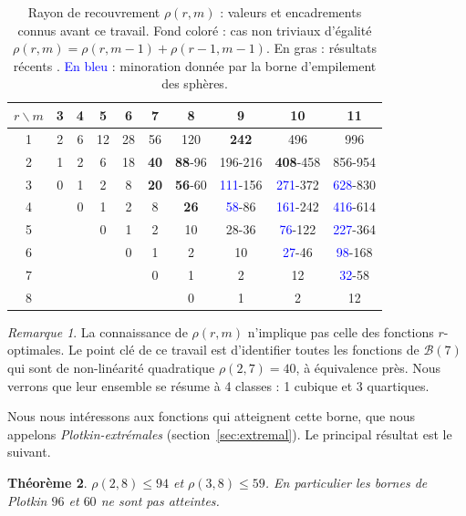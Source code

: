 \documentclass[11pt,a4paper]{article}
\def\boole(#1){\mathcal{B}(#1)}
\def\SPB#1{\textcolor{blue}{#1}}
\theoremstyle{plain}
\newtheorem{theorem}{Théorème}[section]
\theoremstyle{definition}
\theoremstyle{remark}
\newtheorem{remark}[theorem]{Remarque}
\begin{document}
\begin{table}[ht]
\centering
\caption{Rayon de recouvrement $\rho(r,m)$ : valeurs et encadrements connus avant
ce travail. Fond coloré : cas non triviaux d'égalité
$\rho(r,m)=\rho(r,m-1)+\rho(r-1,m-1)$. En gras : résultats récents
\cite{Wang19,GKLW,GL23,RM19,HSS26,KGP26}. \SPB{En bleu} : minoration donnée par la
borne d'empilement des sphères.}
\label{tab:tab_rho}
\begin{tabular}{c|ccccccccc}
$r\backslash m$ & 3 & 4 & 5 & 6 & 7 & 8 & 9 & 10 & 11 \\
\hline
1 & 2 & \cellcolor{plotkin}6 & 12 & \cellcolor{plotkin}28 & 56 & \cellcolor{plotkin}120 & \textbf{242} & 496 & 996 \\
2 & 1 & 2 & 6 & \cellcolor{plotkin}18 & \textbf{40} & \textbf{88}-96 & 196-216 & \textbf{408}-458 & 856-954 \\
3 & 0 & 1 & 2 & \cellcolor{plotkin}8 & \textbf{20} & \textbf{56}-60 & \SPB{111}-156 & \SPB{271}-372 & \SPB{628}-830 \\
4 &  & 0 & 1 & 2 & 8 & \textbf{26} & \SPB{58}-86 & \SPB{161}-242 & \SPB{416}-614 \\
5 &  &  & 0 & 1 & 2 & \cellcolor{plotkin}10 & 28-36 & \SPB{76}-122 & \SPB{227}-364 \\
6 &  &  &  & 0 & 1 & 2 & 10 & \SPB{27}-46 & \SPB{98}-168 \\
7 &  &  &  &  & 0 & 1 & 2 & \cellcolor{plotkin}12 & \SPB{32}-58 \\
8 &  &  &  &  &  & 0 & 1 & 2 & 12 \\
\hline
\end{tabular}
\end{table}
\begin{remark}
La connaissance de $\rho(r,m)$ n'implique pas celle des
fonctions $r$-optimales. Le point clé de ce travail est
d'identifier toutes les fonctions de $\boole(7)$ qui
sont de non-linéarité quadratique $\rho(2,7)=40$, à équivalence près. Nous
verrons que leur ensemble se résume à 4 classes : 1 cubique et 3 quartiques.
\end{remark}

Nous nous intéressons aux fonctions qui atteignent cette borne, que nous
appelons \emph{Plotkin-extrémales} (section~\ref{sec:extremal}). Le principal
résultat est le suivant.

\begin{theorem}\label{thm:main}
$\rho(2,8)\le 94$ et $\rho(3,8)\le 59$. En particulier les bornes de Plotkin
$96$ et $60$ ne sont pas atteintes.
\end{theorem}
\end{document}
